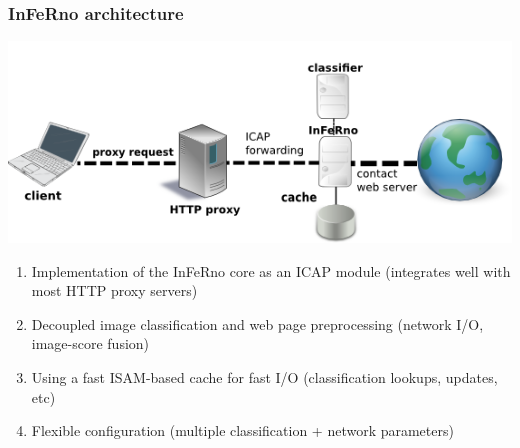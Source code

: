 \documentclass{beamer}
\begin{document}
\begin{frame}
\frametitle{InFeRno architecture}
\begin{center}
	\includegraphics[scale=0.6]{images/network_diagram.png}
	\begin{enumerate}
		\item Implementation of the InFeRno core as an ICAP module (integrates well with most HTTP proxy servers)
		\item Decoupled image classification and web page preprocessing (network I/O, image-score fusion)
		\item Using a fast ISAM-based cache for fast  I/O (classification lookups, updates, etc)
        \item Flexible configuration (multiple classification + network parameters)
	\end{enumerate}
\end{center}
\end{frame}
\end{document}
